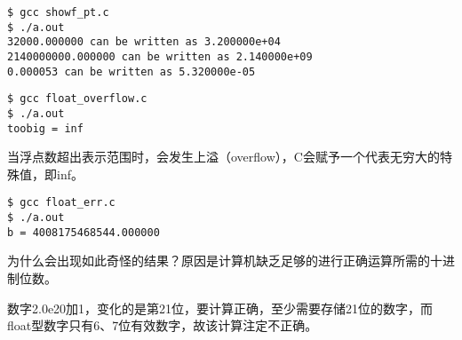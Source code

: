 \begin{frame}[fragile]

\end{frame}

\begin{frame}[fragile] 
\begin{lstlisting}[backgroundcolor=\color{red!10}]
$ gcc showf_pt.c
$ ./a.out
32000.000000 can be written as 3.200000e+04
2140000000.000000 can be written as 2.140000e+09
0.000053 can be written as 5.320000e-05
\end{lstlisting}
\end{frame}
%
\begin{frame}[fragile]

\end{frame}
%
\begin{frame}[fragile]\begin{lstlisting}[backgroundcolor=\color{red!10}]
$ gcc float_overflow.c
$ ./a.out
toobig = inf
\end{lstlisting}

\end{frame}
%
\begin{frame}[fragile]
当浮点数超出表示范围时，会发生上溢（overflow），C会赋予一个代表无穷大的特殊值，即inf。

\end{frame}
%
\begin{frame}[fragile]

\end{frame}
%
\begin{frame}[fragile]\begin{lstlisting}[backgroundcolor=\color{red!10}]
$ gcc float_err.c
$ ./a.out
b = 4008175468544.000000
\end{lstlisting}
\end{frame}
%
\begin{frame}[fragile]
为什么会出现如此奇怪的结果？原因是计算机缺乏足够的进行正确运算所需的十进制位数。
\vspace{0.1in}

数字2.0e20加1，变化的是第21位，要计算正确，至少需要存储21位的数字，而float型数字只有6、7位有效数字，故该计算注定不正确。
\end{frame}
%
%
%
